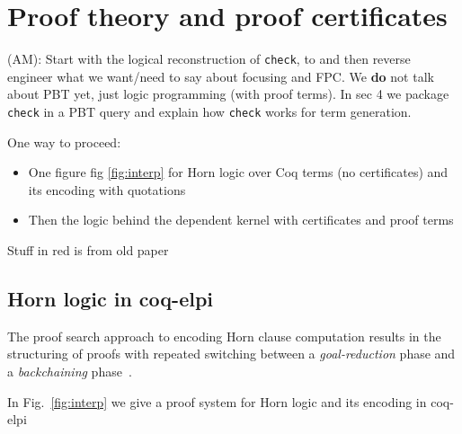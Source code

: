 \section{Proof theory and proof certificates}


\begin{metanote}
  (AM): Start with the logical reconstruction of \texttt{check}, to and then reverse engineer what we want/need to say about focusing and FPC. We \textbf{do} not talk about PBT yet, just logic programming (with proof terms). In sec 4 we package \texttt{check} in a PBT query and explain how \texttt{check} works for term generation.

  One way to proceed:
  
  \begin{itemize}
  \item One figure fig \ref{fig:interp} for Horn logic over Coq terms (no certificates) and its encoding with quotations 
  \item Then the logic behind the dependent kernel with certificates and proof terms
  \end{itemize}
\end{metanote}

Stuff in red is from old paper
\subsection{Horn logic in coq-elpi}


The proof search approach to encoding Horn clause computation
results in the structuring of proofs with repeated
switching between a \emph{goal-reduction} phase and a
\emph{backchaining} phase~\cite{miller91apal}.

In Fig.~\ref{fig:interp} we give a proof system for Horn logic and its encoding in coq-elpi

